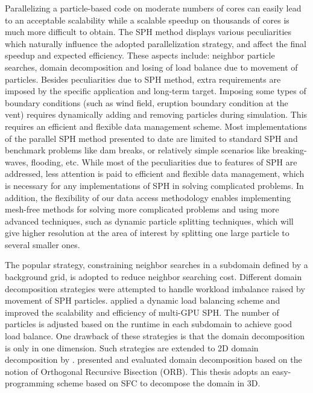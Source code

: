 Parallelizing a particle-based code on moderate numbers of cores can easily lead to an acceptable scalability while a scalable speedup on thousands of cores is much more difficult to obtain. The SPH method displays various peculiarities which naturally influence the adopted parallelization strategy, and affect the final speedup and expected efficiency. These aspects include: neighbor particle searches, domain decomposition and losing of load balance due to movement of particles. Besides peculiarities due to SPH method, extra requirements are imposed by the specific application and long-term target. Imposing some types of boundary conditions (such as wind field, eruption boundary condition at the vent) requires dynamically adding and removing particles during simulation. This requires an efficient and flexible data management scheme. Most implementations of the parallel SPH method presented to date are limited to standard SPH and benchmark problems like dam breaks, or relatively simple scenarios like breaking-waves, flooding, etc. While most of the peculiarities due to features of SPH are addressed, less attention is paid to efficient and flexible data management, which is necessary for any implementations of SPH in solving complicated problems. In addition, the flexibility of our data access methodology enables implementing mesh-free methods for solving more complicated problems and using more advanced techniques, such as dynamic particle splitting techniques\cite{vacondio2012accurate, feldman2007dynamic}, which will give higher resolution at the area of interest by splitting one large particle to several smaller ones.

The popular strategy, constraining neighbor searches in a subdomain defined by  a background grid, is adopted to reduce neighbor searching cost. Different domain decomposition strategies were attempted to handle workload imbalance raised by movement of SPH particles. \citet{dominguez2013new} applied a dynamic load balancing scheme and improved the scalability and efficiency of multi-GPU SPH. The number of particles is adjusted based on the runtime in each subdomain to achieve good load balance. One drawback of these strategies is that the domain decomposition is only in one dimension. Such strategies are extended to 2D domain decomposition by \citet{rustico2014advances}. \citet{oger2016distributed} presented and evaluated domain decomposition based on the notion of Orthogonal Recursive Bisection (ORB). This thesis adopts an easy-programming scheme based on SFC \cite{patra1999efficient} to decompose the domain in 3D.

